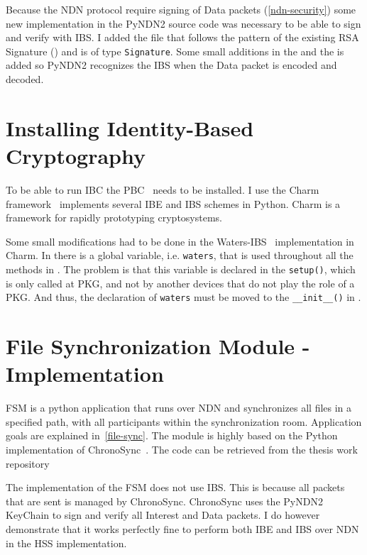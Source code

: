 Because the \gls{NDN} protocol require signing of Data packets (\autoref{ndn-security}) some new implementation in the \gls{PyNDN2} source code was necessary to be able to sign and verify with \gls{IBS}.
I added the  file that follows the pattern of the existing RSA Signature () and is of type \texttt{Signature}.
Some small additions in the  and the  is added so \gls{PyNDN2} recognizes the \gls{IBS} when the Data packet is encoded and decoded.

\section{Installing Identity-Based Cryptography}
To be able to run \gls{IBC} the \gls{PBC}~\cite{ben2007implementation} needs to be installed.
I use the Charm framework~\cite{charm13} implements several \gls{IBE} and \gls{IBS} schemes in Python.
Charm is a framework for rapidly prototyping cryptosystems.


Some small modifications had to be done in the Waters-\gls{IBS}~\cite{DBLP:journals/iacr/Waters04} implementation in Charm.
In  there is a global variable, i.e. \texttt{waters}, that is used throughout all the methods in .
The problem is that this variable is declared in the \texttt{setup()}, which is only called at \gls{PKG}, and not by another devices that do not play the role of a \gls{PKG}. 
And thus, the declaration of \texttt{waters} must be moved to the \texttt{\_\_init\_\_()} in .


\section{File Synchronization Module - Implementation}
\gls{FSM} is a python application that runs over \gls{NDN} and synchronizes all files in a specified path, with all participants within the synchronization room.
Application goals are explained in~\autoref{file-sync}.
The module is highly based on the Python implementation of ChronoSync~\cite[test-chrono-chat.py]{pyndn2-git}.
The code can be retrieved from the thesis work repository~\cite[fileSync.py]{garseg15}

The implementation of the \gls{FSM} does not use \gls{IBS}. 
This is because all packets that are sent is managed by ChronoSync. 
ChronoSync uses the PyNDN2 KeyChain to sign and verify all Interest and Data packets.
I do however demonstrate that it works perfectly fine to perform both \gls{IBE} and \gls{IBS} over \gls{NDN} in the \gls{HSS} implementation.

